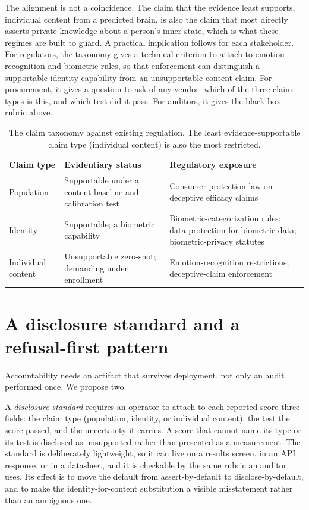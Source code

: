 \documentclass[sigconf,review,anonymous]{acmart}
\begin{document}
The alignment is not a coincidence. The claim that the evidence least supports, individual content from a
predicted brain, is also the claim that most directly asserts private knowledge about a person's inner state,
which is what these regimes are built to guard. A practical implication follows for each stakeholder. For
regulators, the taxonomy gives a technical criterion to attach to emotion-recognition and biometric rules,
so that enforcement can distinguish a supportable identity capability from an unsupportable content claim.
For procurement, it gives a question to ask of any vendor: which of the three claim types is this, and which
test did it pass. For auditors, it gives the black-box rubric above.

\begin{table}[t]
\centering\small
\caption{The claim taxonomy against existing regulation. The least evidence-supportable claim type
(individual content) is also the most restricted.}
\label{tab:reg}
\begin{tabular}{@{}p{1.65cm}p{2.0cm}p{2.9cm}@{}}
\toprule
Claim type & Evidentiary status & Regulatory exposure \\
\midrule
Population & Supportable under a content-baseline and calibration test & Consumer-protection law on deceptive efficacy claims \\
Identity & Supportable; a biometric capability & Biometric-categorization rules; data-protection for biometric data; biometric-privacy statutes \\
Individual content & Unsupportable zero-shot; demanding under enrollment & Emotion-recognition restrictions; deceptive-claim enforcement \\
\bottomrule
\end{tabular}
\end{table}

\section{A disclosure standard and a refusal-first pattern}
Accountability needs an artifact that survives deployment, not only an audit performed once. We propose two.

A \emph{disclosure standard} requires an operator to attach to each reported score three fields: the claim
type (population, identity, or individual content), the test the score passed, and the uncertainty it
carries. A score that cannot name its type or its test is disclosed as unsupported rather than presented as a
measurement. The standard is deliberately lightweight, so it can live on a results screen, in an API
response, or in a datasheet, and it is checkable by the same rubric an auditor uses. Its effect is to move the
default from assert-by-default to disclose-by-default, and to make the identity-for-content substitution a
visible misstatement rather than an ambiguous one.
\end{document}
